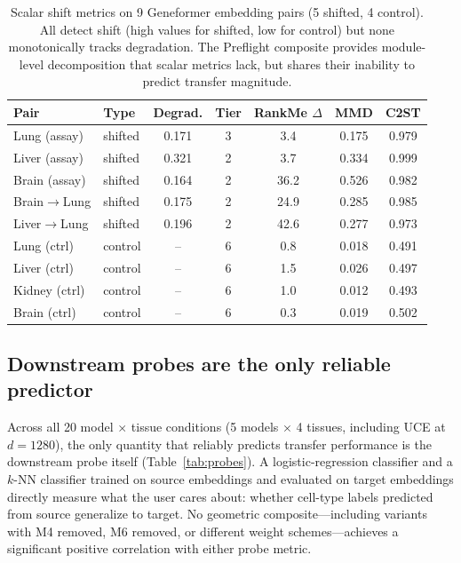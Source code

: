 \documentclass[9pt,lineno]{elife}
\begin{document}
\begin{table}[t]
\centering
\caption{Scalar shift metrics on 9 Geneformer embedding pairs (5 shifted, 4 control). All detect shift (high values for shifted, low for control) but none monotonically tracks degradation. The Preflight composite provides module-level decomposition that scalar metrics lack, but shares their inability to predict transfer magnitude.}
\label{tab:scalar}
\small
\begin{tabular}{@{}llccccc@{}}
\toprule
Pair & Type & Degrad. & Tier & RankMe $\Delta$ & MMD & C2ST \\
\midrule
Lung (assay)  & shifted & 0.171 & 3 & 3.4  & 0.175 & 0.979 \\
Liver (assay) & shifted & 0.321 & 2 & 3.7  & 0.334 & 0.999 \\
Brain (assay) & shifted & 0.164 & 2 & 36.2 & 0.526 & 0.982 \\
Brain$\to$Lung  & shifted & 0.175 & 2 & 24.9 & 0.285 & 0.985 \\
Liver$\to$Lung  & shifted & 0.196 & 2 & 42.6 & 0.277 & 0.973 \\
\midrule
Lung (ctrl)   & control & -- & 6 & 0.8 & 0.018 & 0.491 \\
Liver (ctrl)  & control & -- & 6 & 1.5 & 0.026 & 0.497 \\
Kidney (ctrl) & control & -- & 6 & 1.0 & 0.012 & 0.493 \\
Brain (ctrl)  & control & -- & 6 & 0.3 & 0.019 & 0.502 \\
\bottomrule
\end{tabular}
\end{table}

\subsection{Downstream probes are the only reliable predictor}

Across all 20 model $\times$ tissue conditions (5 models $\times$ 4 tissues, including UCE at $d = 1280$), the only quantity that reliably predicts transfer performance is the downstream probe itself (Table~\ref{tab:probes}). A logistic-regression classifier and a $k$-NN classifier trained on source embeddings and evaluated on target embeddings directly measure what the user cares about: whether cell-type labels predicted from source generalize to target. No geometric composite---including variants with M4 removed, M6 removed, or different weight schemes---achieves a significant positive correlation with either probe metric.
\end{document}
